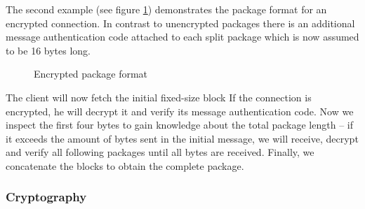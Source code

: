 The second example (see figure \ref{fig:encrypted-package-format}) demonstrates the package format for an encrypted connection.
In contrast to unencrypted packages there is an additional message authentication code attached to each split package which is now assumed to be 16 bytes long.

\begin{figure}
    \center


    \caption{Encrypted package format}
    \label{fig:encrypted-package-format}
\end{figure}

The client will now fetch the initial fixed-size block
If the connection is encrypted, he will decrypt it and verify its message authentication code.
Now we inspect the first four bytes to gain knowledge about the total package length -- if it exceeds the amount of bytes sent in the initial message, we will receive, decrypt and verify all following packages until all bytes are received.
Finally, we concatenate the blocks to obtain the complete package.

\subsubsection{Cryptography}

